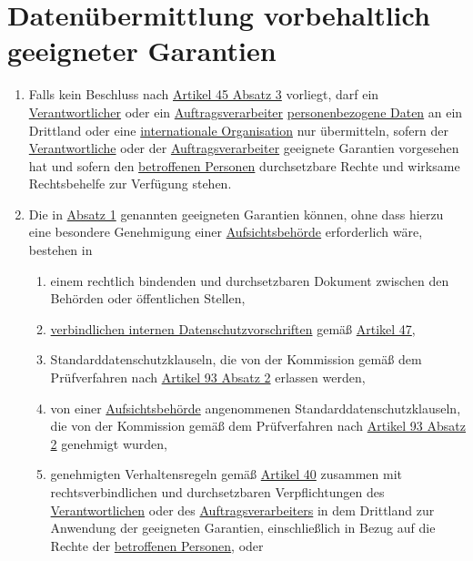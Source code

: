 \chapter{Datenübermittlung vorbehaltlich geeigneter Garantien}
\label{ch:46}

\begin{enumerate}

  \item Falls kein Beschluss nach \hyperref[itm:45-3]{Artikel 45 Absatz 3} vorliegt, darf ein \hyperref[itm:04-7]
   {Verantwortlicher} oder ein
   \hyperref[itm:04-8]{Auftragsverarbeiter} \hyperref[itm:04-1]{personenbezogene Daten} an ein Drittland oder
    eine \hyperref[itm:04-26]{internationale Organisation} nur übermitteln, sofern der \hyperref[itm:04-7]
    {Verantwortliche} oder der \hyperref[itm:04-8]{Auftragsverarbeiter} geeignete Garantien vorgesehen hat und sofern
    den
   \hyperref[itm:04-1]{betroffenen Personen} durchsetzbare Rechte und wirksame Rechtsbehelfe zur Verfügung stehen.%
  \label{itm:46-1}

  \item Die in \hyperref[itm:46-1]{Absatz 1} genannten geeigneten Garantien können, ohne dass hierzu eine besondere
   Genehmigung einer \hyperref[itm:04-21]{Aufsichtsbehörde} erforderlich wäre, bestehen in%
  \label{itm:46-2}

  \begin{enumerate}
  
    \item einem rechtlich bindenden und durchsetzbaren Dokument zwischen den Behörden oder öffentlichen Stellen,%
    \label{itm:46-2a}

    \item \hyperref[itm:04-20]{verbindlichen internen Datenschutzvorschriften} gemäß \hyperref[ch:47]{Artikel 47},%
    \label{itm:46-2b}

    \item Standarddatenschutzklauseln, die von der Kommission gemäß dem Prüfverfahren nach \hyperref[itm:93-2]
     {Artikel 93 Absatz 2} erlassen werden,%
    \label{itm:46-2c}

    \item von einer \hyperref[itm:04-21]{Aufsichtsbehörde} angenommenen Standarddatenschutzklauseln, die von der
     Kommission gemäß dem Prüfverfahren nach \hyperref[itm:93-2]{Artikel 93 Absatz 2} genehmigt wurden,%
    \label{itm:46-2d}

    \item genehmigten Verhaltensregeln gemäß \hyperref[ch:40]{Artikel 40} zusammen mit rechtsverbindlichen und
     durchsetzbaren Verpflichtungen des \hyperref[itm:04-7]{Verantwortlichen} oder des \hyperref[itm:04-8]
     {Auftragsverarbeiters} in dem Drittland zur Anwendung der geeigneten Garantien, einschließlich in Bezug auf die
     Rechte der \hyperref[itm:04-1]{betroffenen Personen}, oder%
    \label{itm:46-2e}


\end{enumerate}
\end{enumerate}
